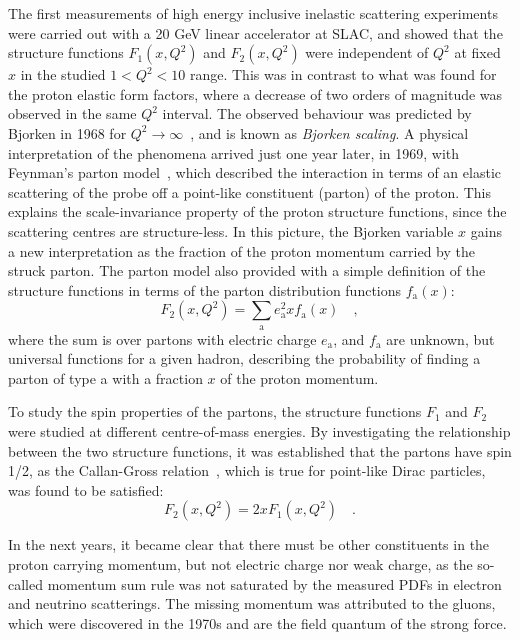 The first measurements of high energy inclusive inelastic scattering experiments were carried out with a 20 GeV linear accelerator at SLAC, and showed that the structure functions $F_1(x,Q^2)$ and $F_2(x,Q^2)$ were independent of $Q^2$ at fixed $x$ in the studied $1< Q^2 < 10$ \gevcc range. This was in contrast to what was found for the proton elastic form factors, where a decrease of two orders of magnitude was observed in the same $Q^2$ interval. The observed behaviour was predicted by Bjorken in 1968 for $Q^2 \rightarrow \infty$~\cite{Bjorken:1968dy}, and is known as \emph{Bjorken scaling}. A physical interpretation of the phenomena arrived just one year later, in 1969, with Feynman's parton model~\cite{Feynman:1969ej}, which described the interaction in terms of an elastic scattering of the probe off a point-like constituent (parton) of the proton. This explains the scale-invariance property of the proton structure functions, since the scattering centres are structure-less. In this picture, the Bjorken variable $x$ gains a new interpretation as the fraction of the proton momentum carried by the struck parton. The parton model also provided with a simple definition of the structure functions in terms of the parton distribution functions $f_\mathrm{a}(x)$:
\begin{equation*}
    F_2(x,Q^2) = \sum_\mathrm{a} e_\mathrm{a}^2 x f_\mathrm{a}(x)\quad ,
\end{equation*}
where the sum is over partons with electric charge $e_\mathrm{a}$, and $f_\mathrm{a}$ are unknown, but universal functions for a given hadron, describing the probability of finding a parton of type a with a fraction $x$ of the proton momentum. 

To study the spin properties of the partons, the structure functions $F_1$ and $F_2$ were studied at different centre-of-mass energies. By investigating the relationship between the two structure functions, it was established that the partons have spin 1/2, as the Callan-Gross relation~\cite{Callan:1969uq}, which is true for point-like Dirac particles, was found to be satisfied:
\begin{equation*}
    F_2(x,Q^2) = 2x F_1(x,Q^2)\quad .
\end{equation*}

In the next years, it became clear that there must be other constituents in the proton carrying momentum, but not electric charge nor weak charge, as the so-called momentum sum rule was not saturated by the measured PDFs in electron and neutrino scatterings. The missing momentum was attributed to the gluons, which were discovered in the 1970s and are the field quantum of the strong force.

